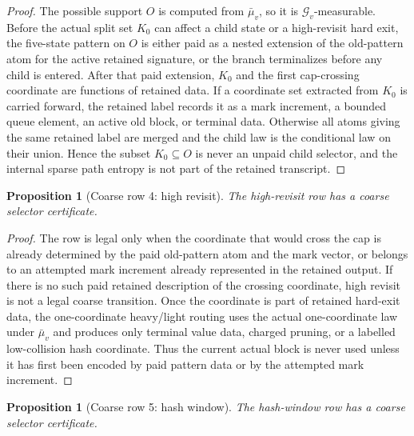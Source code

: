 \documentclass[11pt]{article}
\newtheorem{proposition}[theorem]{Proposition}
\theoremstyle{remark}
\newcommand{\G}{\mathcal G}
\begin{document}
\begin{proof}
The possible support $O$ is computed from $\bar\mu_v$, so it is $\G_v$-measurable.  Before the actual split set $K_0$ can affect a child state or a high-revisit hard exit, the five-state pattern on $O$ is either paid as a nested extension of the old-pattern atom for the active retained signature, or the branch terminalizes before any child is entered.  After that paid extension, $K_0$ and the first cap-crossing coordinate are functions of retained data.  If a coordinate set extracted from $K_0$ is carried forward, the retained label records it as a mark increment, a bounded queue element, an active old block, or terminal data.  Otherwise all atoms giving the same retained label are merged and the child law is the conditional law on their union.  Hence the subset $K_0\subseteq O$ is never an unpaid child selector, and the internal sparse path entropy is not part of the retained transcript.
\end{proof}

\begin{proposition}[Coarse row 4: high revisit]\label{prop:coarse-row-high-revisit}
The high-revisit row has a coarse selector certificate.
\end{proposition}

\begin{proof}
The row is legal only when the coordinate that would cross the cap is already determined by the paid old-pattern atom and the mark vector, or belongs to an attempted mark increment already represented in the retained output.  If there is no such paid retained description of the crossing coordinate, high revisit is not a legal coarse transition.  Once the coordinate is part of retained hard-exit data, the one-coordinate heavy/light routing uses the actual one-coordinate law under $\bar\mu_v$ and produces only terminal value data, charged pruning, or a labelled low-collision hash coordinate.  Thus the current actual block is never used unless it has first been encoded by paid pattern data or by the attempted mark increment.
\end{proof}

\begin{proposition}[Coarse row 5: hash window]\label{prop:coarse-row-hash}
The hash-window row has a coarse selector certificate.
\end{proposition}
\end{document}
